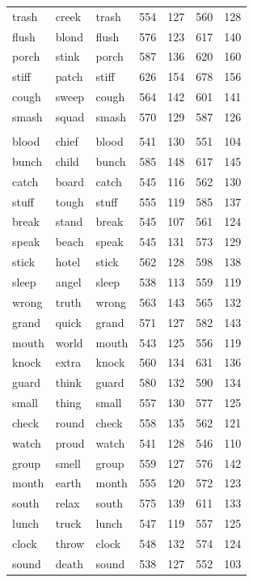 \documentclass[
]{interact}
\begin{document}
\begin{longtable*}{lllrrrr}
trash & creek & trash & 554 & 127 & 560 & 128 \\ 
flush & blond & flush & 576 & 123 & 617 & 140 \\ 
porch & stink & porch & 587 & 136 & 620 & 160 \\ 
stiff & patch & stiff & 626 & 154 & 678 & 156 \\ 
cough & sweep & cough & 564 & 142 & 601 & 141 \\ 
smash & squad & smash & 570 & 129 & 587 & 126 \\ 
\midrule\addlinespace[2.5pt]
 \\ 
\midrule\addlinespace[2.5pt]
blood & chief & blood & 541 & 130 & 551 & 104 \\ 
bunch & child & bunch & 585 & 148 & 617 & 145 \\ 
catch & board & catch & 545 & 116 & 562 & 130 \\ 
stuff & tough & stuff & 555 & 119 & 585 & 137 \\ 
break & stand & break & 545 & 107 & 561 & 124 \\ 
speak & beach & speak & 545 & 131 & 573 & 129 \\ 
stick & hotel & stick & 562 & 128 & 598 & 138 \\ 
sleep & angel & sleep & 538 & 113 & 559 & 119 \\ 
wrong & truth & wrong & 563 & 143 & 565 & 132 \\ 
grand & quick & grand & 571 & 127 & 582 & 143 \\ 
mouth & world & mouth & 543 & 125 & 556 & 119 \\ 
knock & extra & knock & 560 & 134 & 631 & 136 \\ 
guard & think & guard & 580 & 132 & 590 & 134 \\ 
small & thing & small & 557 & 130 & 577 & 125 \\ 
check & round & check & 558 & 135 & 562 & 121 \\ 
watch & proud & watch & 541 & 128 & 546 & 110 \\ 
group & smell & group & 559 & 127 & 576 & 142 \\ 
month & earth & month & 555 & 120 & 572 & 123 \\ 
south & relax & south & 575 & 139 & 611 & 133 \\ 
lunch & truck & lunch & 547 & 119 & 557 & 125 \\ 
clock & throw & clock & 548 & 132 & 574 & 124 \\ 
sound & death & sound & 538 & 127 & 552 & 103 \\ 

\end{longtable*}
\end{document}
